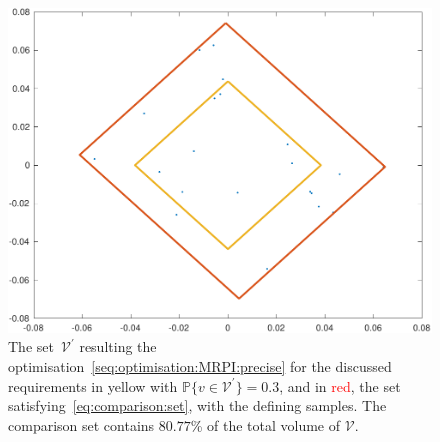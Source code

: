 \documentclass{ifacconf}
\providecommand{\V}{\mathcal V}
\providecommand{\PP}{\mathbb P}
\begin{document}
\begin{figure}
\includegraphics[width=.95\linewidth]{Vprime.pdf}
\caption{The set~$\V^\prime$ resulting the optimisation~\eqref{seq:optimisation:MRPI:precise} for the discussed requirements in \textcolor[rgb]{0.9255,0.6902,0.2078}{yellow} with $\PP\{v\in\V^\prime\}=0.3$, and in \textcolor{red}{red}, the set satisfying~\eqref{eq:comparison:set}, with the defining samples. The comparison set contains $80.77$\% of the total volume of $\V$.}
\label{figure:V:prime:and:comparison}
\vspace{4mm}
\end{figure}
\end{document}
